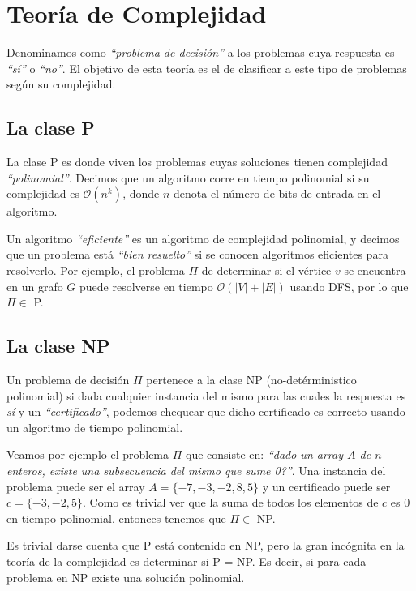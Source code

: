 \newpage
\section{Teor\'ia de Complejidad}

Denominamos como \emph{``problema de decisi\'on''} a los problemas cuya respuesta es \emph{``s\'i''} o \emph{``no''}. El objetivo de esta teor\'ia es el de clasificar a este tipo de problemas seg\'un su complejidad.

\subsection{La clase P}

La clase P es donde viven los problemas cuyas soluciones tienen complejidad \emph{``polinomial''}. Decimos que un algoritmo corre en tiempo polinomial si su complejidad es $\mathcal{O}(n^k)$, donde $n$ denota el n\'umero de bits de entrada en el algoritmo.

Un algoritmo \emph{``eficiente''} es un algoritmo de complejidad polinomial, y decimos que un problema est\'a \emph{``bien resuelto''} si se conocen algoritmos eficientes para resolverlo. Por ejemplo, el problema $\Pi$ de determinar si el v\'ertice $v$ se encuentra en un grafo $G$ puede resolverse en tiempo $\mathcal{O}(|V|+|E|)$ usando DFS, por lo que $\Pi \in$ P.

\subsection{La clase NP}

Un problema de decisi\'on $\Pi$ pertenece a la clase NP (no-det\'erministico polinomial) si dada cualquier instancia del mismo para las cuales la respuesta es \emph{s\'i} y un \emph{``certificado''}, podemos chequear que dicho certificado es correcto usando un algoritmo de tiempo polinomial.

Veamos por ejemplo el problema $\Pi$ que consiste en: \emph{``dado un array $A$ de $n$ enteros, existe una subsecuencia del mismo que sume 0?''}. Una instancia del problema puede ser el array $A = \{-7, -3, -2, 8, 5\}$ y un certificado puede ser $c = \{-3, -2, 5\}$. Como es trivial ver que la suma de todos los elementos de $c$ es $0$ en tiempo polinomial, entonces tenemos que $\Pi \in$ NP.

Es trivial darse cuenta que P est\'a contenido en NP, pero la gran inc\'ognita en la teor\'ia de la complejidad es determinar si P = NP. Es decir, si para cada problema en NP existe una soluci\'on polinomial.


